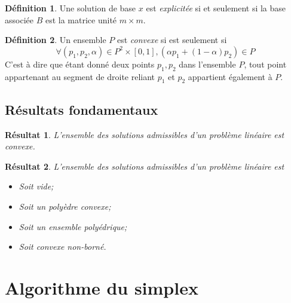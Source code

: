 \documentclass[a4paper]{report}
\theoremstyle{definition}
\newtheorem*{definition}{Définition}
\theoremstyle{remark}
\theoremstyle{plain}
\newtheorem*{result}{Résultat}
\begin{document}
\begin{definition}
Une solution de base \(x\) est \emph{explicitée} si et
seulement si la base associée \(B\) est la matrice unité \(m\times m\).
\end{definition}

\begin{definition}
Un ensemble \(P\) est \emph{convexe} si est seulement
si
\[\forall (p_1,p_2,\alpha)\in P^2\times[0,1],(\alpha p_1+(1-\alpha)p_2)\in P\]
C'est à dire que étant donné deux points \(p_1,p_2\) dans l'ensemble \(P\),
tout point appartenant au segment de droite reliant \(p_1\) et \(p_2\)
appartient également à \(P\).
\end{definition}

\subsection{Résultats fondamentaux}
\begin{result}
L'ensemble des solutions admissibles d'un problème linéaire est convexe.
\end{result}

\begin{result}
L'ensemble des solutions admissibles d'un problème linéaire est
\begin{itemize}
	\item Soit vide;
	\item Soit un polyèdre convexe;
	\item Soit un ensemble polyédrique;
	\item Soit convexe non-borné.
\end{itemize}
\end{result}

\section{Algorithme du simplex}
\end{document}

